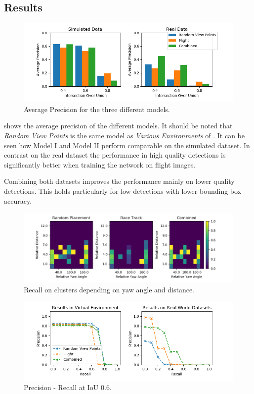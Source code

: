 \subsection{Results}

\begin{figure}[htbp]
	\includegraphics[width=\textwidth]{fig/view_bar}
	\caption{Average Precision for the three different models.}
	\label{fig:view_bar}
\end{figure}

 shows the average precision of the different models. It should be noted that \textit{Random View Points} is the same model as \textit{Various Environments} of . It can be seen how Model I and Model II perform comparable on the simulated dataset. In contrast on the real dataset the performance in high quality detections is significantly better when training the network on flight images.

Combining both datasets improves the performance mainly on lower quality detections. This holds particularly for low detections with lower bounding box accuracy.


\begin{figure}[htbp]
	\centering
	\includegraphics[width=\textwidth]{fig/recall_yaw}
	\caption{Recall on clusters depending on yaw angle and distance.}
	\label{fig:recall_yaw}
\end{figure}

\begin{figure}[htbp]
	\centering
	\includegraphics[width=\textwidth]{fig/view_pr}
	\caption{Precision - Recall at IoU 0.6.}
	\label{fig:view_pr}
\end{figure}

